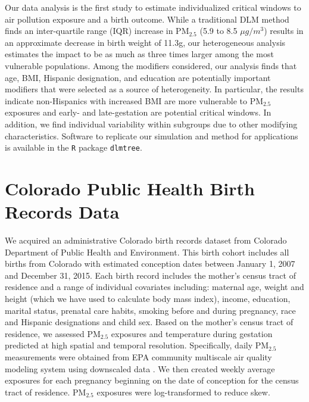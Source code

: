 \documentclass[12pt]{article}
\begin{document}
Our data analysis is the first study to estimate individualized critical windows to air pollution exposure and a birth outcome. While a traditional DLM method finds an inter-quartile range (IQR) increase in PM$_{2.5}$ (5.9 to 8.5 $\mu g/m^3$) results in an approximate decrease in birth weight of 11.3g, our heterogeneous analysis estimates the impact to be as much as three times larger among the most vulnerable populations. Among the modifiers considered, our analysis finds that age, BMI, Hispanic designation, and education are potentially important modifiers that were selected as a source of heterogeneity. In particular, the results indicate non-Hispanics with increased BMI are more vulnerable to PM$_{2.5}$ exposures and early- and late-gestation are potential critical windows. In addition, we find individual variability within subgroups due to other modifying characteristics. Software to replicate our simulation and method for applications is available in the \texttt{R} package \texttt{dlmtree}.


\section{Colorado Public Health Birth Records Data}\label{sec:co_birth_data}
We acquired an administrative Colorado birth records dataset from Colorado Department of Public Health and Environment. This birth cohort includes all births from Colorado with estimated conception dates between January 1, 2007 and December 31, 2015. Each birth record includes the mother's census tract of residence and a range of individual covariates including: maternal age, weight and height (which we have used to calculate body mass index), income, education, marital status, prenatal care habits, smoking before and during pregnancy, race and Hispanic designations and child sex. Based on the mother's census tract of residence, we assessed PM$_{2.5}$ exposures and temperature during gestation predicted at high spatial and temporal resolution. Specifically, daily PM$_{2.5}$ measurements were obtained from EPA community multiscale air quality modeling system using downscaled data \citep{Berrocal2010AModels}. We then created weekly average exposures for each pregnancy beginning on the date of conception for the census tract of residence. PM$_{2.5}$ exposures were log-transformed to reduce skew. 
\end{document}
